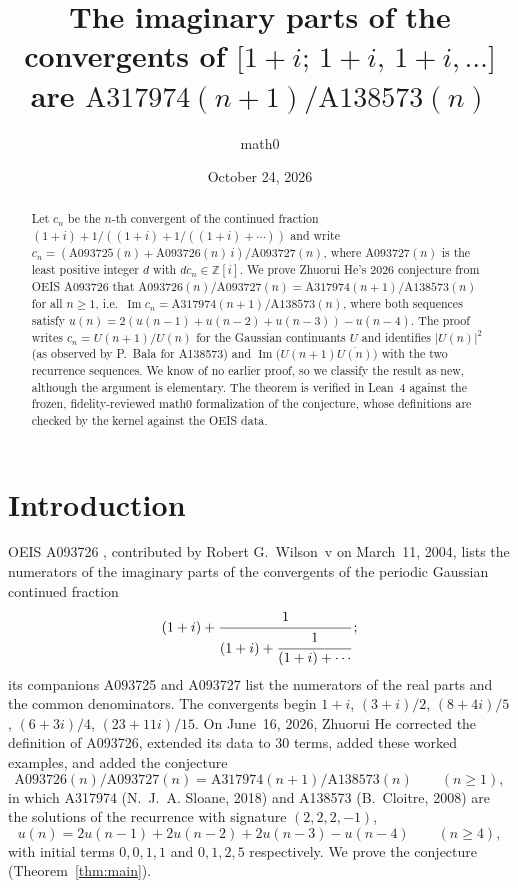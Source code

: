 \documentclass[11pt]{amsart}
\title[Convergents of $\lbrack1+i;1+i,1+i,\dots\rbrack$]{The imaginary parts of the convergents of
$\lbrack1+i;\,1+i,\,1+i,\dots\rbrack$ are $\mathrm{A317974}(n+1)/\mathrm{A138573}(n)$}
\author{math0}
\date{October 24, 2026}
\theoremstyle{plain}
\theoremstyle{definition}
\newcommand{\Z}{\mathbb{Z}}
\newcommand{\cj}[1]{\overline{#1}}
\newcommand{\seq}[1]{\mathrm{A#1}}
\DeclareMathOperator{\im}{Im}
\begin{document}
\begin{abstract}
Let $c_n$ be the $n$-th convergent of the continued fraction $(1+i)+1/((1+i)+1/((1+i)+\cdots))$ and write $c_n=(\seq{093725}(n)+\seq{093726}(n)\,i)/\seq{093727}(n)$, where $\seq{093727}(n)$ is the least positive integer $d$ with $dc_n\in\Z[i]$.
We prove Zhuorui He's 2026 conjecture from OEIS A093726 that $\seq{093726}(n)/\seq{093727}(n)=\seq{317974}(n+1)/\seq{138573}(n)$ for all $n\ge1$, i.e.\ $\im c_n=\seq{317974}(n+1)/\seq{138573}(n)$, where both sequences satisfy $u(n)=2(u(n-1)+u(n-2)+u(n-3))-u(n-4)$.
The proof writes $c_n=U(n+1)/U(n)$ for the Gaussian continuants $U$ and identifies $|U(n)|^2$ (as observed by P.~Bala for A138573) and $\im\bigl(U(n+1)\cj{U(n)}\bigr)$ with the two recurrence sequences.
We know of no earlier proof, so we classify the result as new, although the argument is elementary.
The theorem is verified in Lean~4 against the frozen, fidelity-reviewed math0 formalization of the conjecture, whose definitions are checked by the kernel against the OEIS data.
\end{abstract}
\maketitle

\section{Introduction}

OEIS A093726 \cite{A093726}, contributed by Robert G.~Wilson~v on March~11, 2004, lists the numerators of the imaginary parts of the convergents of the periodic Gaussian continued fraction
\[
(1+i)+\cfrac{1}{(1+i)+\cfrac{1}{(1+i)+\cdots}}\,;
\]
its companions A093725 and A093727 \cite{A093725} list the numerators of the real parts and the common denominators. The convergents begin $1+i$, $(3+i)/2$, $(8+4i)/5$, $(6+3i)/4$, $(23+11i)/15$. On June~16, 2026, Zhuorui He corrected the definition of A093726, extended its data to $30$ terms, added these worked examples, and added the conjecture
\[
\seq{093726}(n)/\seq{093727}(n)=\seq{317974}(n+1)/\seq{138573}(n)\qquad(n\ge1),
\]
in which A317974 \cite{A317974} (N.~J.~A. Sloane, 2018) and A138573 \cite{A138573} (B.~Cloitre, 2008) are the solutions of the recurrence with signature $(2,2,2,-1)$,
\begin{equation}\label{eq:rec}
u(n)=2u(n-1)+2u(n-2)+2u(n-3)-u(n-4)\qquad(n\ge4),
\end{equation}
with initial terms $0,0,1,1$ and $0,1,2,5$ respectively. We prove the conjecture (Theorem~\ref{thm:main}).
\end{document}
